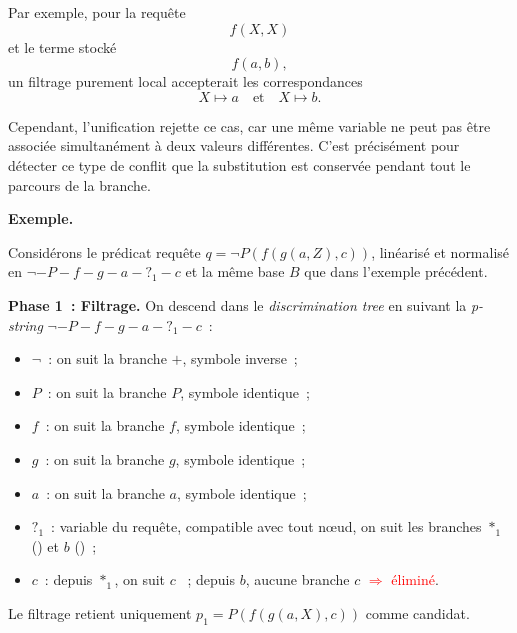 \documentclass[11pt]{article}
\newenvironment{paraph}[1]{%
  \medskip
  \noindent\textbf{#1.}\quad

  \vspace{0.2cm}
}{%
  \medskip
}
\begin{document}
    \vspace{0.2cm}
    Par exemple, pour la requête
\[
f(X, X)
\]
et le terme stocké
\[
f(a, b),
\]
un filtrage purement local accepterait les correspondances
\[
X \mapsto a
\quad \text{et} \quad
X \mapsto b.
\]

Cependant, l’unification rejette ce cas, car une même variable 
ne peut pas être associée simultanément à deux valeurs différentes. 
C’est précisément pour détecter ce type de conflit que la substitution 
est conservée pendant tout le parcours de la branche.

\begin{paraph}{Exemple}
    \vspace{0.2cm}
    Considérons le prédicat requête $q = \neg P(f(g(a, Z), c))$, linéarisé et normalisé en 
    $\neg -P-f-g-a-{?_1}-c$ et la même base $B$ que dans l'exemple précédent.

    \vspace{0.4em}
    \noindent\textbf{Phase 1~: Filtrage.} On descend dans le \textit{discrimination tree} 
    en suivant la \textit{p-string} $\neg -P-f-g-a-{?_1}-c$~:
\end{paraph}

\begin{itemize}
    \item $\neg$~: on suit la branche $+$, symbole inverse~;
    \item $P$~: on suit la branche $P$, symbole identique~;
    \item $f$~: on suit la branche $f$, symbole identique~;
    \item $g$~: on suit la branche $g$, symbole identique~;
    \item $a$~: on suit la branche $a$, symbole identique~;
    \item $?_1$~: variable du requête, compatible avec tout nœud, on suit 
          les branches $*_1$ \textcolor{green!60!black}{(\checkmark)} et 
          $b$ \textcolor{orange!80!black}{(\checkmark)}~;
    \item $c$~: depuis $*_1$, on suit $c$ 
          \textcolor{green!60!black}{\checkmark}~; depuis $b$, aucune 
          branche $c$ \textcolor{red}{$\Rightarrow$ éliminé}.
\end{itemize}

\noindent Le filtrage retient uniquement $p_1 = P(f(g(a, X), c))$ comme candidat.
\end{document}
